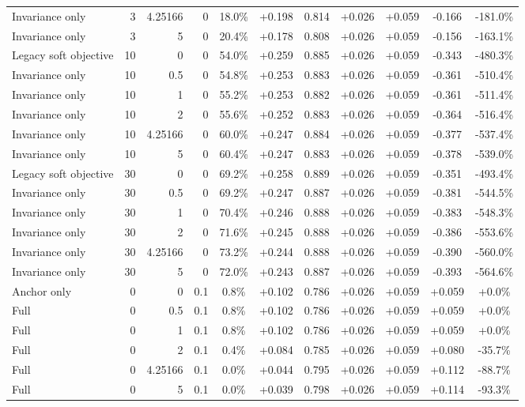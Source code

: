 \begin{table}[htbp]
\begin{tabular}{lrrrccccccc}
Invariance only & 3 & 4.25166 & 0 & 18.0\% & +0.198 & 0.814 & +0.026 & +0.059 & -0.166 & -181.0\% \\
Invariance only & 3 & 5 & 0 & 20.4\% & +0.178 & 0.808 & +0.026 & +0.059 & -0.156 & -163.1\% \\
Legacy soft objective & 10 & 0 & 0 & 54.0\% & +0.259 & 0.885 & +0.026 & +0.059 & -0.343 & -480.3\% \\
Invariance only & 10 & 0.5 & 0 & 54.8\% & +0.253 & 0.883 & +0.026 & +0.059 & -0.361 & -510.4\% \\
Invariance only & 10 & 1 & 0 & 55.2\% & +0.253 & 0.882 & +0.026 & +0.059 & -0.361 & -511.4\% \\
Invariance only & 10 & 2 & 0 & 55.6\% & +0.252 & 0.883 & +0.026 & +0.059 & -0.364 & -516.4\% \\
Invariance only & 10 & 4.25166 & 0 & 60.0\% & +0.247 & 0.884 & +0.026 & +0.059 & -0.377 & -537.4\% \\
Invariance only & 10 & 5 & 0 & 60.4\% & +0.247 & 0.883 & +0.026 & +0.059 & -0.378 & -539.0\% \\
Legacy soft objective & 30 & 0 & 0 & 69.2\% & +0.258 & 0.889 & +0.026 & +0.059 & -0.351 & -493.4\% \\
Invariance only & 30 & 0.5 & 0 & 69.2\% & +0.247 & 0.887 & +0.026 & +0.059 & -0.381 & -544.5\% \\
Invariance only & 30 & 1 & 0 & 70.4\% & +0.246 & 0.888 & +0.026 & +0.059 & -0.383 & -548.3\% \\
Invariance only & 30 & 2 & 0 & 71.6\% & +0.245 & 0.888 & +0.026 & +0.059 & -0.386 & -553.6\% \\
Invariance only & 30 & 4.25166 & 0 & 73.2\% & +0.244 & 0.888 & +0.026 & +0.059 & -0.390 & -560.0\% \\
Invariance only & 30 & 5 & 0 & 72.0\% & +0.243 & 0.887 & +0.026 & +0.059 & -0.393 & -564.6\% \\
Anchor only & 0 & 0 & 0.1 & 0.8\% & +0.102 & 0.786 & +0.026 & +0.059 & +0.059 & +0.0\% \\
Full & 0 & 0.5 & 0.1 & 0.8\% & +0.102 & 0.786 & +0.026 & +0.059 & +0.059 & +0.0\% \\
Full & 0 & 1 & 0.1 & 0.8\% & +0.102 & 0.786 & +0.026 & +0.059 & +0.059 & +0.0\% \\
Full & 0 & 2 & 0.1 & 0.4\% & +0.084 & 0.785 & +0.026 & +0.059 & +0.080 & -35.7\% \\
Full & 0 & 4.25166 & 0.1 & 0.0\% & +0.044 & 0.795 & +0.026 & +0.059 & +0.112 & -88.7\% \\
Full & 0 & 5 & 0.1 & 0.0\% & +0.039 & 0.798 & +0.026 & +0.059 & +0.114 & -93.3\% \\

\end{tabular}
\end{table}
